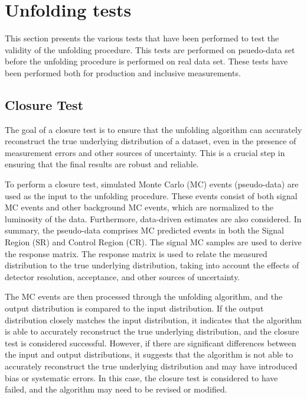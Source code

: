 \section{Unfolding tests}
\label{sec:unfolding_tests}
This section presents the various tests that have been performed to test the validity of the unfolding procedure. This tests are performed on psuedo-data set before the unfolding procedure is performed on real data set. These tests have been performed both for \tty production and inclusive \tty measurements. 

\subsection{Closure Test}
\label{sec:closure_test}

The goal of a closure test is to ensure that the unfolding algorithm can accurately reconstruct the true underlying distribution of a dataset, even in the presence of measurement errors and other sources of uncertainty. This is a crucial step in ensuring that the final results are robust and reliable.

To perform a closure test, simulated Monte Carlo (MC) events (pseudo-data) are used as the input to the unfolding procedure. These events consist of both signal MC events and other background MC events, which are normalized to the luminosity of the data. Furthermore, data-driven estimates are also considered. In summary, the pseudo-data comprises MC predicted events in both the Signal Region (SR) and Control Region (CR). The signal MC samples are used to derive the response matrix. The response matrix is used to relate the measured distribution to the true underlying distribution, 
taking into account the effects of detector resolution, acceptance, and other sources of uncertainty.

The MC events are then processed through the unfolding algorithm, and the output distribution is compared to the input distribution. If the output distribution closely matches the input distribution, it indicates that the algorithm is able to accurately reconstruct the true underlying distribution, and the closure test is considered successful. However, if there are significant differences between the input and output distributions, it suggests that the algorithm is not able to accurately reconstruct the true underlying distribution and may have introduced bias or systematic errors. In this case, the closure test is considered to have failed, and the algorithm may need to be revised or modified.

